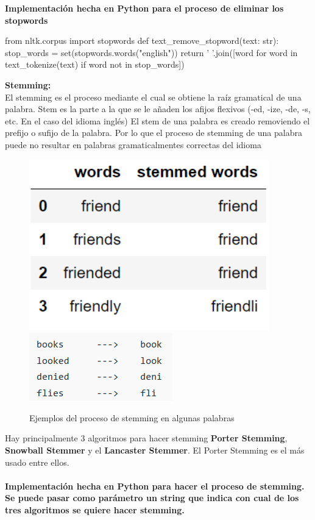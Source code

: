 \documentclass{llncs}
\begin{document}
\noindent
\textbf{Implementación hecha en Python para el proceso de eliminar los stopwords}

\begin{python}
    from nltk.corpus import stopwords
    def text_remove_stopword(text: str):
        stop_words = set(stopwords.words("english"))  
        return ' '.join([word for word in text_tokenize(text) if word not in stop_words])
    
\end{python}

\noindent
\textbf{Stemming:}\\ 
\noindent
El stemming es el proceso mediante el cual se obtiene la raíz gramatical de una palabra. 
Stem es la parte a la que se le añaden los afijos flexivos (-ed, -ize, -de, -s, etc. En el caso del idioma inglés)
El stem de una palabra es creado removiendo el prefijo o sufijo de la palabra. Por lo que el proceso
de stemming de una palabra puede no resultar en palabras gramaticalmentes correctas del idioma

\begin{figure}
    
    \includegraphics[scale = .3]{./images/stemming1png.png}
    \includegraphics[scale = .7]{./images/stemming2png.png}
    \caption{Ejemplos del proceso de stemming en algunas palabras}
\end{figure}

Hay principalmente 3 algoritmos para hacer stemming \textbf{Porter Stemming}, 
\textbf{ Snowball Stemmer} y el \textbf{Lancaster Stemmer}. El Porter Stemming 
es el más usado entre ellos.
\\\\
\textbf{Implementación hecha en Python para hacer el proceso de stemming. Se puede pasar como parámetro un string que indica con cual de los tres algoritmos se quiere hacer stemming.}
\end{document}
